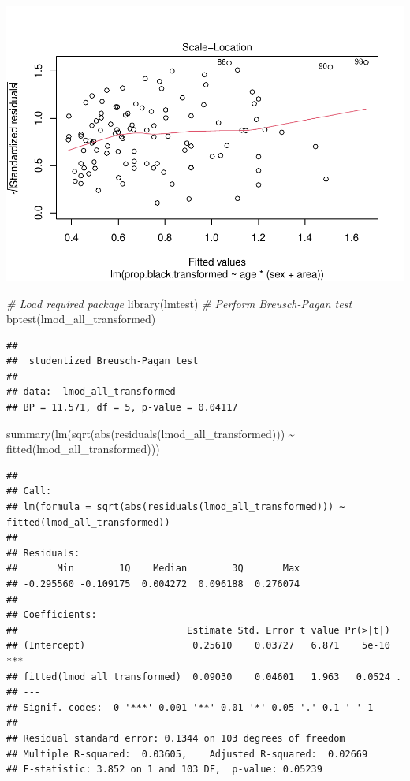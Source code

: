 \documentclass[
]{article}
\newenvironment{Shaded}{\begin{snugshade}}{\end{snugshade}}
\newcommand{\CommentTok}[1]{\textcolor[rgb]{0.56,0.35,0.01}{\textit{#1}}}
\newcommand{\FunctionTok}[1]{\textcolor[rgb]{0.00,0.00,0.00}{#1}}
\newcommand{\NormalTok}[1]{#1}
\newcommand{\SpecialCharTok}[1]{\textcolor[rgb]{0.00,0.00,0.00}{#1}}
\begin{document}
\includegraphics{code_files/figure-latex/unnamed-chunk-25-3.pdf}

\begin{Shaded}
\begin{Highlighting}[]
\CommentTok{\# Load required package}
\FunctionTok{library}\NormalTok{(lmtest)}
\CommentTok{\# Perform Breusch{-}Pagan test}
\FunctionTok{bptest}\NormalTok{(lmod\_all\_transformed)}
\end{Highlighting}
\end{Shaded}

\begin{verbatim}
## 
##  studentized Breusch-Pagan test
## 
## data:  lmod_all_transformed
## BP = 11.571, df = 5, p-value = 0.04117
\end{verbatim}

\begin{Shaded}
\begin{Highlighting}[]
\FunctionTok{summary}\NormalTok{(}\FunctionTok{lm}\NormalTok{(}\FunctionTok{sqrt}\NormalTok{(}\FunctionTok{abs}\NormalTok{(}\FunctionTok{residuals}\NormalTok{(lmod\_all\_transformed))) }\SpecialCharTok{\textasciitilde{}} \FunctionTok{fitted}\NormalTok{(lmod\_all\_transformed)))}
\end{Highlighting}
\end{Shaded}

\begin{verbatim}
## 
## Call:
## lm(formula = sqrt(abs(residuals(lmod_all_transformed))) ~ fitted(lmod_all_transformed))
## 
## Residuals:
##       Min        1Q    Median        3Q       Max 
## -0.295560 -0.109175  0.004272  0.096188  0.276074 
## 
## Coefficients:
##                              Estimate Std. Error t value Pr(>|t|)    
## (Intercept)                   0.25610    0.03727   6.871    5e-10 ***
## fitted(lmod_all_transformed)  0.09030    0.04601   1.963   0.0524 .  
## ---
## Signif. codes:  0 '***' 0.001 '**' 0.01 '*' 0.05 '.' 0.1 ' ' 1
## 
## Residual standard error: 0.1344 on 103 degrees of freedom
## Multiple R-squared:  0.03605,    Adjusted R-squared:  0.02669 
## F-statistic: 3.852 on 1 and 103 DF,  p-value: 0.05239
\end{verbatim}
\end{document}
